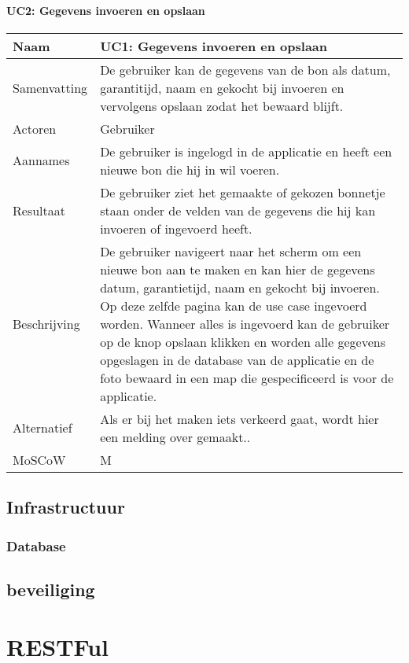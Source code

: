 \documentclass[a4paper,11pt,oneside]{report}
\begin{document}
\subsubsection{UC2: Gegevens invoeren en opslaan} %
\label{ssub:gegevens_invoeren_en_opslaan}
\begin{tabularx}{\linewidth}{| g | X |}
  \hline
  Naam      & UC1: Gegevens invoeren en opslaan \\ \hline
  Samenvatting  &  De gebruiker kan de gegevens van de bon als datum,
garantitijd, naam en gekocht bij invoeren en vervolgens opslaan zodat het
bewaard blijft. \\ \hline
  Actoren     & Gebruiker \\ \hline
  Aannames    & De gebruiker is ingelogd in de applicatie en heeft een nieuwe
bon die hij in wil voeren. \\ \hline
  Resultaat     & De gebruiker ziet het gemaakte of gekozen bonnetje staan onder
de velden van de gegevens die hij kan invoeren of ingevoerd heeft.
\\ \hline
  Beschrijving  &  De gebruiker navigeert naar het scherm om een nieuwe bon aan
te maken en kan hier de gegevens datum, garantietijd, naam en gekocht bij
invoeren. Op deze zelfde pagina kan de use case
 ingevoerd worden. Wanneer alles is
ingevoerd kan de gebruiker op de knop opslaan klikken en worden alle gegevens
opgeslagen in de database van de applicatie en de foto bewaard in een map die
gespecificeerd is voor de applicatie.\\ \hline
  Alternatief   & Als er bij het maken iets verkeerd gaat, wordt hier een
melding over gemaakt.. \\ \hline
MoSCoW & M \\ \hline
\end{tabularx}

\section{Infrastructuur}
\subsection{Database}
\section{beveiliging}
\chapter{RESTFul}
\end{document}
